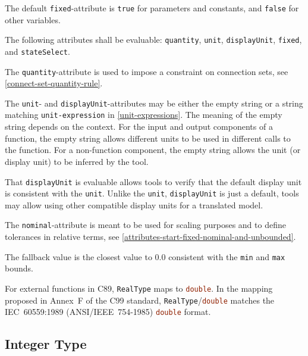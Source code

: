 The default \lstinline!fixed!-attribute is \lstinline!true! for parameters and constants, and \lstinline!false! for other variables.

The following attributes shall be evaluable: \lstinline!quantity!, \lstinline!unit!, \lstinline!displayUnit!, \lstinline!fixed!, and \lstinline!stateSelect!.

The \lstinline!quantity!-attribute is used to impose a constraint on connection sets, see \cref{connect-set-quantity-rule}.

The \lstinline!unit!- and \lstinline!displayUnit!-attributes may be either the empty string or a string matching \lstinline[language=grammar]!unit-expression! in \cref{unit-expressions}.
The meaning of the empty string depends on the context.
For the input and output components of a function, the empty string allows different units to be used in different calls to the function.
For a non-function component, the empty string allows the unit (or display unit) to be inferred by the tool.

\begin{nonnormative}
That \lstinline!displayUnit! is evaluable allows tools to verify that the default display unit is consistent with the \lstinline!unit!.
Unlike the \lstinline!unit!, \lstinline!displayUnit! is just a default, tools may allow using other compatible display units for a translated model.
\end{nonnormative}

The \lstinline!nominal!-attribute is meant to be used for scaling purposes and to define tolerances in relative terms, see \cref{attributes-start-fixed-nominal-and-unbounded}.

The fallback value is the closest value to $0.0$ consistent with the \lstinline!min! and \lstinline!max! bounds.

\begin{nonnormative}
For external functions in C89, \lstinline!RealType! maps to \lstinline[language=C]!double!.
In the mapping proposed in Annex~F of the C99 standard, \lstinline!RealType!/\lstinline[language=C]!double! matches the IEC~60559:1989 (ANSI/IEEE~754-1985) \lstinline[language=C]!double! format.
\end{nonnormative}

\subsection{Integer Type}\label{integer-type}

